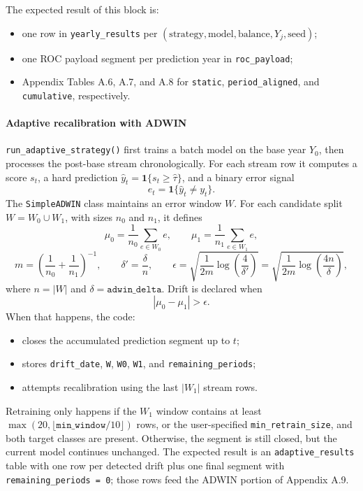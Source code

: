 The expected result of this block is:
\begin{itemize}[leftmargin=*]
  \item one row in \texttt{yearly\_results} per \((\text{strategy}, \text{model}, \text{balance}, Y_j, \text{seed})\);
  \item one ROC payload segment per prediction year in \texttt{roc\_payload};
  \item Appendix Tables A.6, A.7, and A.8 for \texttt{static}, \texttt{period\_aligned}, and \texttt{cumulative}, respectively.
\end{itemize}

\paragraph{Adaptive recalibration with ADWIN}
\texttt{run\_adaptive\_strategy()} first trains a batch model on the base year \(Y_0\), then processes the post-base stream chronologically. For each stream row it computes a score \(s_t\), a hard prediction \(\hat{y}_t = \mathbf{1}\{s_t \ge \hat{\tau}\}\), and a binary error signal
\[
e_t = \mathbf{1}\{\hat{y}_t \neq y_t\}.
\]
The \texttt{SimpleADWIN} class maintains an error window \(W\). For each candidate split \(W = W_0 \cup W_1\), with sizes \(n_0\) and \(n_1\), it defines
\[
\mu_0 = \frac{1}{n_0}\sum_{e \in W_0} e,
\qquad
\mu_1 = \frac{1}{n_1}\sum_{e \in W_1} e,
\]
\[
m = \left(\frac{1}{n_0} + \frac{1}{n_1}\right)^{-1},
\qquad
\delta' = \frac{\delta}{n},
\qquad
\epsilon = \sqrt{\frac{1}{2m}\log\left(\frac{4}{\delta'}\right)}
= \sqrt{\frac{1}{2m}\log\left(\frac{4n}{\delta}\right)},
\]
where \(n = |W|\) and \(\delta = \texttt{adwin\_delta}\). Drift is declared when
\[
|\mu_0 - \mu_1| > \epsilon.
\]
When that happens, the code:
\begin{itemize}[leftmargin=*]
  \item closes the accumulated prediction segment up to \(t\);
  \item stores \texttt{drift\_date}, \texttt{W}, \texttt{W0}, \texttt{W1}, and \texttt{remaining\_periods};
  \item attempts recalibration using the last \(|W_1|\) stream rows.
\end{itemize}
Retraining only happens if the \(W_1\) window contains at least \(\max(20, \lfloor \texttt{min\_window}/10 \rfloor)\) rows, or the user-specified \texttt{min\_retrain\_size}, and both target classes are present. Otherwise, the segment is still closed, but the current model continues unchanged. The expected result is an \texttt{adaptive\_results} table with one row per detected drift plus one final segment with \texttt{remaining\_periods = 0}; those rows feed the ADWIN portion of Appendix A.9.

